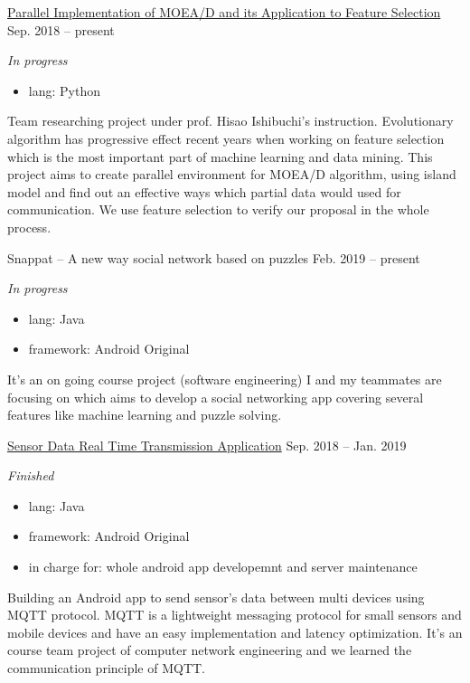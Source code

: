 \documentclass[hidelinks__VERSION__]{adamyi-cv}
\begin{document}
\begin{entrylist}


\entry
{\href{https://github.com/hackroid/pMOEA-D}{Parallel Implementation of MOEA/D and its Application to Feature Selection}}
{Sep. 2018 -- present}
{\emph{In progress}
\begin{itemize}
    \item lang: Python
\end{itemize}
Team researching project under prof. Hisao Ishibuchi's instruction. Evolutionary algorithm has progressive effect recent years when working on feature selection which is the most important part of machine learning and data mining. This project aims to create parallel environment for MOEA/D algorithm, using island model and find out an effective ways which partial data would used for communication. We use feature selection to verify our proposal in the whole process.
}


\entry
{Snappat -- A new way social network based on puzzles}
{Feb. 2019 -- present}
{\emph{In progress}
\begin{itemize}
    \item lang: Java
    \item framework: Android Original
\end{itemize}
It's an on going course project (software engineering) I and my teammates are focusing on which aims to develop a social networking app covering several features like machine learning and puzzle solving.
}


\entry
{\href{https://github.com/hackroid/MqttSensorDemo}{Sensor Data Real Time Transmission Application}}
{Sep. 2018 -- Jan. 2019}
{\emph{Finished}
\begin{itemize}
    \item lang: Java
    \item framework: Android Original
    \item in charge for: whole android app developemnt and server maintenance
\end{itemize}
Building an Android app to send sensor's data between multi devices using MQTT protocol. MQTT is a lightweight messaging protocol for small sensors and mobile devices and have an easy implementation and latency optimization. It's an course team project of computer network engineering and we learned the communication principle of MQTT.
}


\end{entrylist}
\end{document}
